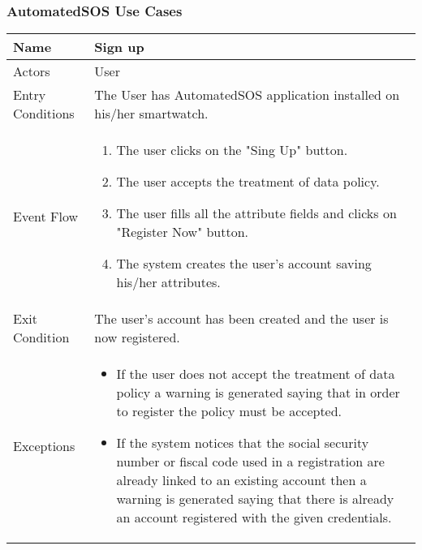 \subsubsection{AutomatedSOS Use Cases}
\begin{table}[h]
\begin{tabular}{|l|l|}
\hline
Name             & Sign up \\ \hline
Actors           & User  \\ \hline
Entry Conditions & The User has AutomatedSOS application installed on his/her smartwatch.    \\ \hline
Event Flow       & \parbox{.45\textwidth}{\begin{enumerate}
            \item The user clicks on the "Sing Up" button.
            \item The user accepts the treatment of data policy.
            \item The user fills all the attribute fields and clicks on "Register Now" button.
            \item The system creates the user's account saving his/her attributes.
        \end{enumerate}}\\ \hline
Exit Condition   & The user's account has been created and the user is now registered.\\ \hline
Exceptions       & \parbox{.45\textwidth}  
{\begin{itemize}
\item If the user does not accept the treatment of data policy a warning is generated saying that in order to register the policy must be accepted.
\item If the system notices that the social security number or fiscal code used in a registration are already linked to an existing account then a warning is generated saying that there is already an account registered with the given credentials.
\end{itemize}}\\ \hline
\end{tabular}
\end{table}

